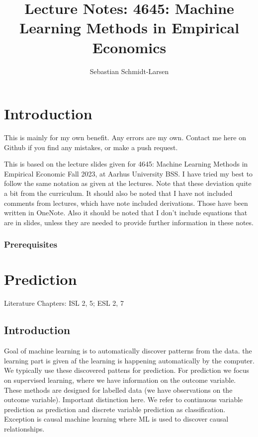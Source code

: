 \documentclass[11pt,a4paper]{article}
\begin{document}
  

\title{Lecture Notes: 4645: Machine Learning Methods in Empirical Economics}
\author{Sebastian Schmidt-Larsen}
\maketitle

\section{Introduction}

This is mainly for my own benefit. Any errors are my own. Contact me here on Github if you find any mistakes, or make a push request.

This is based on the lecture slides given for 4645: Machine Learning Methods in Empirical Economic Fall 2023, at Aarhus University BSS.
I have tried my best to follow the same notation as given at the lectures. Note that these deviation quite a bit from the curriculum.
It should also be noted that I have not included comments from lectures, which have note included derivations. Those have been written in OneNote.
Also it should be noted that I don't include equations that are in slides, unless they are needed to provide further information in these notes.



\subsubsection*{Prerequisites}

\section{Prediction}

Literature Chapters: ISL 2, 5; ESL 2, 7

\subsection{Introduction}

Goal of machine learning is to automatically discover patterns from the data.
the learning part is given af the learning is happening automatically by the computer.
We  typically use these discovered pattens for prediction.
\newline
For prediction we focus on supervised learning, where we have information on the outcome variable. These methods are designed  for labelled data (we have observations on the outcome variable). 
\newline 
Important distinction here. We refer to continuous variable prediction as prediction and discrete variable prediction as classification. Exception is causal machine learning where ML is used to discover causal relationships.
\end{document}
